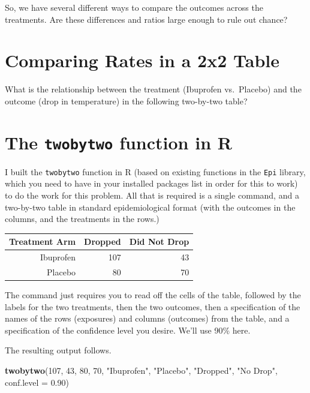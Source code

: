 \documentclass[
]{book}
\newenvironment{Shaded}{\begin{snugshade}}{\end{snugshade}}
\newcommand{\DataTypeTok}[1]{\textcolor[rgb]{0.13,0.29,0.53}{#1}}
\newcommand{\DecValTok}[1]{\textcolor[rgb]{0.00,0.00,0.81}{#1}}
\newcommand{\FloatTok}[1]{\textcolor[rgb]{0.00,0.00,0.81}{#1}}
\newcommand{\KeywordTok}[1]{\textcolor[rgb]{0.13,0.29,0.53}{\textbf{#1}}}
\newcommand{\NormalTok}[1]{#1}
\newcommand{\StringTok}[1]{\textcolor[rgb]{0.31,0.60,0.02}{#1}}
\begin{document}
So, we have several different ways to compare the outcomes across the treatments. Are these differences and ratios large enough to rule out chance?

\hypertarget{comparing-rates-in-a-2x2-table}{%
\section{Comparing Rates in a 2x2 Table}\label{comparing-rates-in-a-2x2-table}}

What is the relationship between the treatment (Ibuprofen vs.~Placebo) and the outcome (drop in temperature) in the following two-by-two table?

\hypertarget{the-twobytwo-function-in-r}{%
\section{\texorpdfstring{The \texttt{twobytwo} function in R}{The twobytwo function in R}}\label{the-twobytwo-function-in-r}}

I built the \texttt{twobytwo} function in R (based on existing functions in the \texttt{Epi} library, which you need to have in your installed packages list in order for this to work) to do the work for this problem. All that is required is a single command, and a two-by-two table in standard epidemiological format (with the outcomes in the columns, and the treatments in the rows.)

\begin{longtable}[]{@{}rrr@{}}
\toprule
Treatment Arm & Dropped & Did Not Drop\tabularnewline
\midrule
\endhead
Ibuprofen & 107 & 43\tabularnewline
Placebo & 80 & 70\tabularnewline
\bottomrule
\end{longtable}

The command just requires you to read off the cells of the table, followed by the labels for the two treatments, then the two outcomes, then a specification of the names of the rows (exposures) and columns (outcomes) from the table, and a specification of the confidence level you desire. We'll use 90\% here.

The resulting output follows.

\begin{Shaded}
\begin{Highlighting}[]
\KeywordTok{twobytwo}\NormalTok{(}\DecValTok{107}\NormalTok{, }\DecValTok{43}\NormalTok{, }\DecValTok{80}\NormalTok{, }\DecValTok{70}\NormalTok{, }
         \StringTok{"Ibuprofen"}\NormalTok{, }\StringTok{"Placebo"}\NormalTok{, }\StringTok{"Dropped"}\NormalTok{, }\StringTok{"No Drop"}\NormalTok{,}
         \DataTypeTok{conf.level =} \FloatTok{0.90}\NormalTok{)}
\end{Highlighting}
\end{Shaded}
\end{document}

